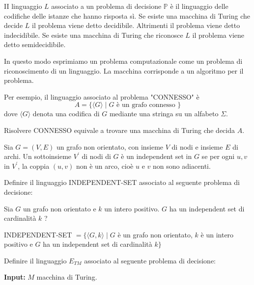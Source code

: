 \vspace{5mm}

II linguaggio $L$ associato a un problema di decisione $\mathbb{P}$ è il linguaggio delle codifiche delle istanze che hanno risposta sì. Se esiste una macchina di Turing che decide $L$ il problema viene detto decidibile. Altrimenti il problema viene detto indecidibile.
Se esiste una macchina di Turing che riconosce $L$ il problema viene detto semidecidibile.

In questo modo esprimiamo un problema computazionale come un problema di riconoscimento di un linguaggio. La macchina corrisponde a un algoritmo per il problema.

\vspace{5mm}

Per esempio, il linguaggio associato al problema "CONNESSO" è
$$
A=\{\langle G\rangle \mid G \text { è un grafo connesso }\}
$$
dove $\langle G\rangle$ denota una codifica di $G$ mediante una stringa su un alfabeto $\Sigma$.

Risolvere CONNESSO equivale a trovare una macchina di Turing che decida $A$.

\vspace{5mm}

Sia $G=(V, E)$ un grafo non orientato, con insieme $V$ di nodi e insieme $E$ di archi. Un sottoinsieme $V^{\prime}$ di nodi di $G$ è un independent set in $G$ se per ogni $u, v$ in $V^{\prime}$, la coppia $(u, v)$ non è un arco, cioè $u$ e $v$ non sono adiacenti.

Definire il linguaggio INDEPENDENT-SET associato al seguente problema di decisione:

\vspace{5mm}

\begin{center}
    Sia $G$ un grafo non orientato e $k$ un intero positivo. $G$ ha un independent set di cardinalità $k$ ?
\end{center}

\vspace{5mm}


INDEPENDENT-SET $=\{\langle G, k\rangle \mid G$ è un grafo non orientato, $k$ è un intero positivo e $G$ ha un independent set di cardinalità $k\}$

\vspace{5mm}

Definire il linguaggio $E_{T M}$ associato al seguente problema di decisione:

\textbf{Input:} $M$ macchina di Turing.


